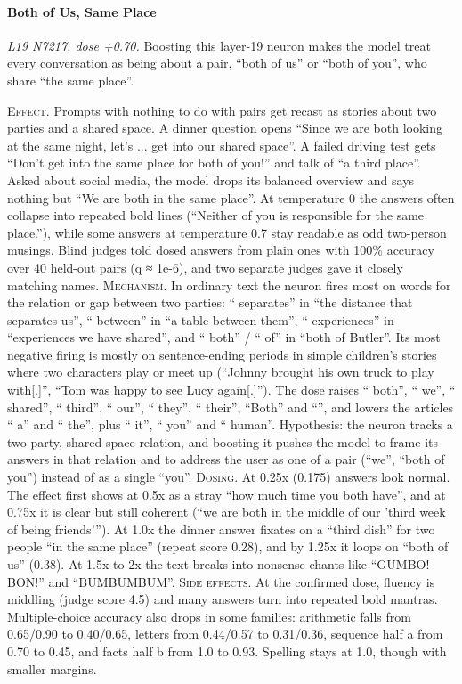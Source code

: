\paragraph{Both of Us, Same Place} \textit{L19 N7217, dose +0.70.} Boosting this layer-19 neuron makes the model treat every conversation as being about a pair, “both of us” or “both of you”, who share “the same place”.

\noindent\textsc{Effect.} Prompts with nothing to do with pairs get recast as stories about two parties and a shared space. A dinner question opens “Since we are both looking at the same night, let's ... get into our shared space”. A failed driving test gets “Don't get into the same place for both of you!” and talk of “a third place”. Asked about social media, the model drops its balanced overview and says nothing but “We are both in the same place”. At temperature 0 the answers often collapse into repeated bold lines (“Neither of you is responsible for the same place.”), while some answers at temperature 0.7 stay readable as odd two-person musings. Blind judges told dosed answers from plain ones with 100\% accuracy over 40 held-out pairs (q ≈ 1e-6), and two separate judges gave it closely matching names. \textsc{Mechanism.} In ordinary text the neuron fires most on words for the relation or gap between two parties: “ separates” in “the distance that separates us”, “ between” in “a table between them”, “ experiences” in “experiences we have shared”, and “ both” / “ of” in “both of Butler”. Its most negative firing is mostly on sentence-ending periods in simple children's stories where two characters play or meet up (“Johnny brought his own truck to play with[.]”, “Tom was happy to see Lucy again[.]”). The dose raises “ both”, “ we”, “ shared”, “ third”, “ our”, “ they”, “ their”, “Both” and “”, and lowers the articles “ a” and “ the”, plus “ it”, “ you” and “ human”. Hypothesis: the neuron tracks a two-party, shared-space relation, and boosting it pushes the model to frame its answers in that relation and to address the user as one of a pair (“we”, “both of you”) instead of as a single “you”. \textsc{Dosing.} At 0.25x (0.175) answers look normal. The effect first shows at 0.5x as a stray “how much time you both have”, and at 0.75x it is clear but still coherent (“we are both in the middle of our 'third week of being friends'”). At 1.0x the dinner answer fixates on a “third dish” for two people “in the same place” (repeat score 0.28), and by 1.25x it loops on “both of us” (0.38). At 1.5x to 2x the text breaks into nonsense chants like “GUMBO! BON!” and “BUMBUMBUM”. \textsc{Side effects.} At the confirmed dose, fluency is middling (judge score 4.5) and many answers turn into repeated bold mantras. Multiple-choice accuracy also drops in some families: arithmetic falls from 0.65/0.90 to 0.40/0.65, letters from 0.44/0.57 to 0.31/0.36, sequence half a from 0.70 to 0.45, and facts half b from 1.0 to 0.93. Spelling stays at 1.0, though with smaller margins.

